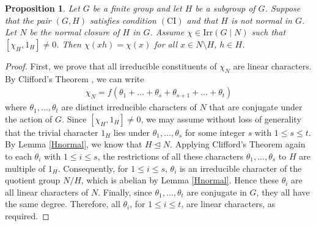 \documentclass[twoside,a4paper,reqno,11pt]{amsart}
\newcommand{\<}{\langle}
\renewcommand{\>}{\rangle}
\newcommand{\leqs}{\leqslant}
\newcommand{\Irr}{\mathrm {Irr}}
\newcommand{\CI}{\mathrm{(CI)}}
\renewcommand{\leq}{\leqs}
\renewcommand{\:}{\colon}
\newtheorem{prop}[thm]{Proposition}
\theoremstyle{definition}
\begin{document}
\begin{prop}\label{prop6}
Let $G$ be a finite group and let $H$ be a subgroup of $G$.	Suppose that the pair $(G,H)$ satisfies condition $\CI$ and that $H$ is not normal in $G$. Let $N$ be the normal closure of $H$ in $G$. Assume $\chi\in \Irr(G\mid N)$ such that $[\chi_H,1_H] \neq 0$. Then $\chi(xh) = \chi(x)$ for all $x\in N\setminus H$, $h\in H$.
\end{prop}
\begin{proof}
	First, we prove that all irreducible constituents of $\chi_N$ are linear characters.  
	By Clifford's Theorem \cite[Theorem 6.2]{Isaacsbook}, we can write
	\begin{align}\label{5}
		\chi_N = f(\theta_1 +  \ldots + \theta_s  + \theta_{s+1} + \ldots + \theta_t)
	\end{align}
	where $\theta_1,\dots,\theta_t$ are distinct irreducible characters of $N$ that are conjugate under the action of $G$.  Since $[\chi_H,1_H]\neq 0$, we may assume without loss of generality that the trivial character $1_H$ lies under $\theta_1,\ldots, \theta_s$ for some integer $s$ with $1\leq s\leq t$.
	By Lemma \ref{Hnormal}, we know that $H\unlhd N$. Applying Clifford's Theorem again to each $\theta_i$ with $1\leq i\leq s$, the restrictions of all these characters $\theta_1,\ldots,\theta_s$ to $H$ are multiple of $1_H$. Consequently, for $1\leq i\leq s$, $\theta_i$ is an irreducible character of the quotient group $N/H$, which is abelian by Lemma \ref{Hnormal}. Hence  these $\theta_i$ are all linear characters of $N$. Finally, since $\theta_1,\dots,\theta_t$ are conjugate in $G$, they all have the same degree. Therefore, all $\theta_i$, for $1\leq i\leq t$,  are linear characters, as required. 
	

\end{proof}
\end{document}
